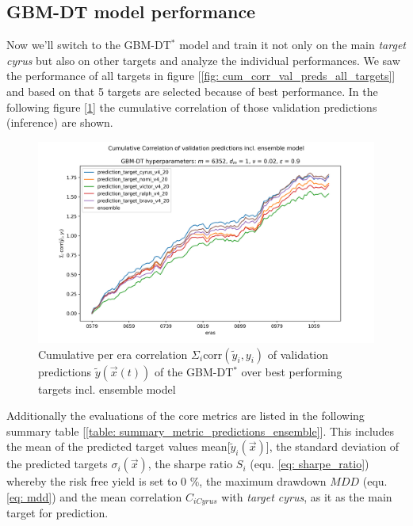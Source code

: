 \documentclass[12pt, a4paper]{article}
\begin{document}
\subsection{GBM-DT model performance}
Now we'll switch to the GBM-DT$^{\ast}$ model and train it not only on the main \textit{target cyrus} but also on other targets and analyze the individual performances. We saw the performance of all targets in figure [\ref{fig: cum_corr_val_preds_all_targets}] and based on that 5 targets are selected because of best performance. In the following figure [\ref{fig: cum_corr_val_preds_ensemble}] the cumulative correlation of those validation predictions (inference) are shown.
\begin{figure}[!htpb]
    \centering
    \includegraphics[width=1\textwidth,trim={0 0 0 0},clip]{rounds/2024-01-17_round1_cumulative_correlation_of_validation_predicitions_ensemble.png}
    \caption[Cumulative per era correlation of validation predictions over the GBM-DT$^{\ast}$ ensemble model with comparison]{Cumulative per era correlation $\Sigma_i \text{corr}(\tilde{y}_i,y_i)$ of validation predictions $\tilde{y}(\vec{x}(t))$ of the GBM-DT$^{\ast}$ over best performing targets incl. ensemble model}
    \label{fig: cum_corr_val_preds_ensemble}
\end{figure}
Additionally the evaluations of the core metrics are listed in the following summary table [\ref{table: summary_metric_predictions_ensemble}]. This includes the mean of the predicted target values mean[$\tilde{y}_i(\vec{x})$], the standard deviation of the predicted targets $\sigma_i(\vec{x})$, the sharpe ratio $S_i$ (equ. \ref{eq: sharpe_ratio}) whereby the risk free yield is set to 0 \%, the maximum drawdown $MDD$ (equ. \ref{eq: mdd}) and the mean correlation $C_{iCyrus}$ with \textit{target cyrus}, as it as the main target for prediction.
\end{document}
